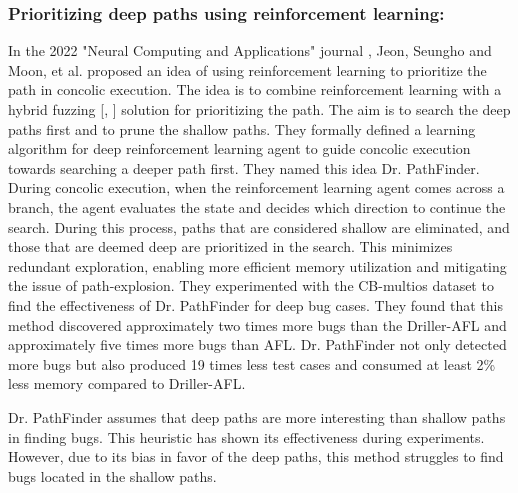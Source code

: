\documentclass[	runningheads,
				a4paper]{llncs}
\begin{document}
\subsubsection{Prioritizing deep paths using reinforcement learning:}
In the 2022 "Neural Computing and Applications" journal \cite{drPathfinder2022}, Jeon, Seungho and Moon, et al. proposed an idea \cite[Dr. PathFinder]{drPathfinder2022} of using reinforcement learning to prioritize the path in concolic execution. The idea is to combine reinforcement learning with a hybrid fuzzing [\cite{miller1990empirical}, \cite{godefroid2012sage}] solution for prioritizing the path. The aim is to search the deep paths first and to prune the shallow paths. They formally defined a learning algorithm for deep reinforcement learning agent to guide concolic execution towards searching a deeper path first. They named this idea Dr. PathFinder. During concolic execution, when the reinforcement learning agent comes across a branch, the agent evaluates the state and decides which direction to continue the search. During this process, paths that are considered shallow are eliminated, and those that are deemed deep are prioritized in the search. This minimizes redundant exploration, enabling more efficient memory utilization and mitigating the issue of path-explosion. They experimented with the CB-multios dataset to find the effectiveness of Dr. PathFinder for deep bug cases.  They found that this method discovered approximately two times more bugs than the Driller-AFL and approximately five times more bugs than AFL. Dr. PathFinder not only detected more bugs but also produced 19 times less test cases and consumed at least 2\% less memory compared to Driller-AFL. 

Dr. PathFinder assumes that deep paths are more interesting than shallow paths in finding bugs. This heuristic has shown its effectiveness during experiments. However, due to its bias in favor of the deep paths, this method struggles to find bugs located in the shallow paths.

\end{document}
